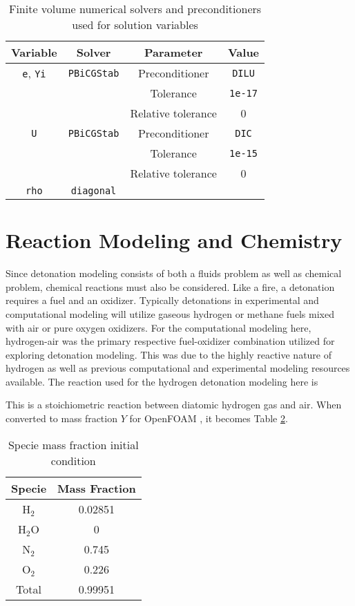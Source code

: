 \begin{table}[h]
\centering
\caption{Finite volume numerical solvers and preconditioners used for solution variables}
\label{tab:numerics}
\begin{tabular}{cccc}
Variable & Solver & Parameter & Value \\ \hline 
\verb|e|, \verb|Yi| & \verb|PBiCGStab| & Preconditioner & \verb|DILU| \\ 
& & Tolerance & \verb|1e-17| \\ 
& & Relative tolerance & 0 \\
\verb|U| & \verb|PBiCGStab| & Preconditioner & \verb|DIC| \\ 
& & Tolerance & \verb|1e-15| \\ 
& & Relative tolerance & 0 \\
\verb|rho| & \verb|diagonal| & & \\
\end{tabular}
\end{table}


\section{Reaction Modeling and Chemistry}
Since detonation modeling consists of both a fluids problem as well as chemical problem, chemical reactions must also be considered. Like a fire, a detonation requires a fuel and an oxidizer. Typically detonations in experimental and computational modeling will utilize gaseous hydrogen or methane fuels mixed with air or pure oxygen oxidizers. For the computational modeling here, hydrogen-air was the primary respective fuel-oxidizer combination utilized for exploring detonation modeling. This was due to the highly reactive nature of hydrogen as well as previous computational and experimental modeling resources available. The reaction used \cite{kuo} for the hydrogen detonation modeling here is
\begin{center}
\end{center}
This is a stoichiometric reaction between diatomic hydrogen gas and air. When converted to mass fraction \(Y\) for OpenFOAM \cite{marcantoni}, it becomes Table \ref{tab:y}.
\begin{table}[H]
\centering
\caption{Specie mass fraction initial condition}
\label{tab:y}
\begin{tabular}{cc}
Specie & Mass Fraction \\ \hline
H\(_2\) & 0.02851 \\ 
H\(_2\)O & 0 \\
N\(_2\) & 0.745 \\ 
O\(_2\) & 0.226 \\ 
Total & 0.99951 \\ 
\end{tabular}
\end{table}

